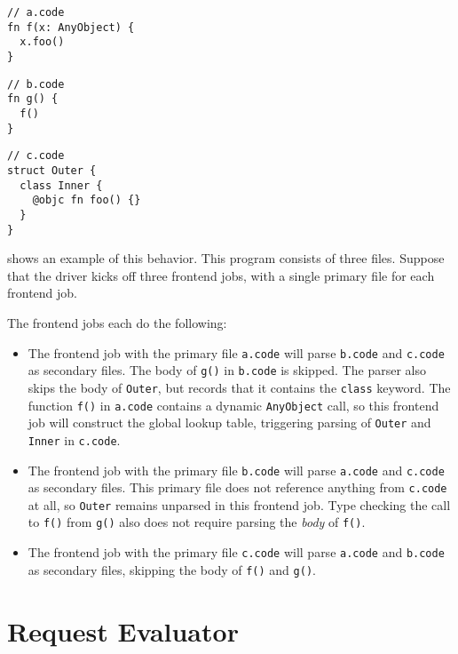 \documentclass[../generics]{subfiles}
\begin{document}
\begin{listing}[b!]\label{anyobjectdelayedparse}
\begin{Verbatim}
// a.code
fn f(x: AnyObject) {
  x.foo()
}
\end{Verbatim}

\begin{Verbatim}
// b.code
fn g() {
  f()
}
\end{Verbatim}

\begin{Verbatim}
// c.code
struct Outer {
  class Inner {
    @objc fn foo() {}
  }
}
\end{Verbatim}
\end{listing}

\begin{example}\label{anyobjectdelayedparseex}
 shows an example of this behavior. This program consists of three files. Suppose that the driver kicks off three frontend jobs, with a single primary file for each frontend job.

The frontend jobs each do the following:
\begin{itemize}
\item The frontend job with the primary file \texttt{a.code} will parse \texttt{b.code} and \texttt{c.code} as secondary files. The body of \texttt{g()} in \texttt{b.code} is skipped. The parser also skips the body of \texttt{Outer}, but records that it contains the \texttt{class} keyword. The function \texttt{f()} in \texttt{a.code} contains a dynamic \texttt{AnyObject} call, so this frontend job will construct the global lookup table, triggering parsing of \texttt{Outer} and \texttt{Inner} in \texttt{c.code}.
\item The frontend job with the primary file \texttt{b.code} will parse \texttt{a.code} and \texttt{c.code} as secondary files. This primary file does not reference anything from \texttt{c.code} at all, so \texttt{Outer} remains unparsed in this frontend job. Type checking the call to \texttt{f()} from \texttt{g()} also does not require parsing the \emph{body} of \texttt{f()}.
\item The frontend job with the primary file \texttt{c.code} will parse \texttt{a.code} and \texttt{b.code} as secondary files, skipping the body of \texttt{f()} and \texttt{g()}.
\end{itemize}
\end{example}

\section{Request Evaluator}\label{request evaluator}
\end{document}
